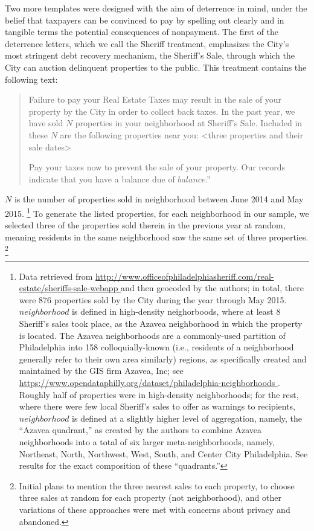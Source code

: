 \documentclass[12pt,titlepage]{article}
\begin{document}
Two more templates were designed with the aim of deterrence in mind, under 
the belief that taxpayers can be convinced to pay by spelling out clearly 
and in tangible terms the potential consequences of nonpayment. The first 
of the deterrence letters, which we call the Sheriff treatment, emphasizes 
the City's most stringent debt recovery mechanism, the Sheriff's Sale, 
through which the City can auction delinquent properties to the public. 
This treatment contains the following text: 

\blockquote{
	Failure to pay your Real Estate Taxes may result in the sale of 
	your property by the City in order to collect back taxes. In the 
	past year, we have sold $N$ properties in your neighborhood at 
	Sheriff's Sale.	Included in these $N$ are the following properties 
	near you: <three properties and their sale dates> 

	Pay your taxes now to prevent the sale of your property. 
	Our records indicate that you have a balance due of $balance$.”
}

$N$ is the number of properties sold in neighborhood between June 2014
and May 2015.
\footnote{\label{fn:neighborhoods}
	Data retrieved from
	\url{
	http://www.officeofphiladelphiasheriff.com/real-estate/sheriffs-sale-webapp
	}
	and then geocoded by the authors; in total, there were 876 properties 
	sold by the City during the year through May 2015. $neighborhood$ is defined 
	in high-density neighorboods, where at least 8 Sheriff's sales took place,
	as the Azavea neighborhood in which the property is located. The Azavea 
	neighborhoods are a commonly-used partition of Philadelphia into 158 
	colloquially-known (i.e., residents of a neighborhood generally refer to 
	their own area similarly) regions, as specifically created and maintained 
	by the GIS firm Azavea, Inc; see 
	\url{
	https://www.opendataphilly.org/dataset/philadelphia-neighborhoods
	}
	. Roughly half of properties were in high-density neighborhoods; for the rest, where 
	there were few local Sheriff's sales to offer as warnings to recipients, 
	$neighborhood$ is defined at a slightly higher level of aggregation, namely, 
	the “Azavea quadrant,” as created by the authors to combine Azavea 
	neighborhoods into a total of six larger meta-neighborhoods, namely, 
	Northeast, North, Northwest, West, South, and Center City Philadelphia. 
	See results for the exact composition of these “quadrants.”
}
To generate the listed properties, for each neighborhood
in our sample, we selected three of the properties sold therein in the
previous year at random, meaning residents in the same neighborhood
saw the same set of three properties.
\footnote{
	Initial plans to mention the three nearest sales to each property, 
	to choose three sales at random for each property (not neighborhood), 
	and other variations of these approaches were met with concerns 
	about privacy and abandoned.
}
\end{document}
